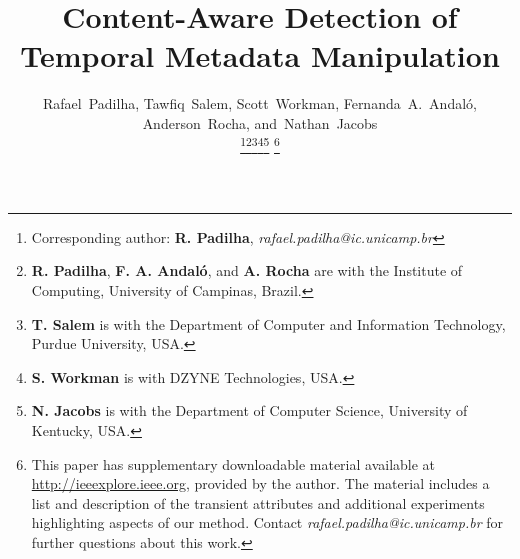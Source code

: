 \documentclass[journal]{IEEEtran}
\begin{document}
\title{Content-Aware Detection of\\ Temporal Metadata Manipulation}


\author{Rafael~Padilha, Tawfiq~Salem, Scott~Workman, Fernanda~A.~Andaló, Anderson~Rocha, and~Nathan~Jacobs

\thanks{Corresponding author: \textbf{R. Padilha}, \textit{rafael.padilha@ic.unicamp.br}}\thanks{\textbf{R. Padilha}, \textbf{F. A. Andaló}, and \textbf{A. Rocha} are with the Institute of Computing, 
University of Campinas, Brazil.}\thanks{\textbf{T. Salem} is with the Department of Computer and Information Technology, Purdue University, USA.}\thanks{\textbf{S. Workman} is with DZYNE Technologies, USA.}\thanks{\textbf{N. Jacobs} is with the Department of Computer Science, University of Kentucky, USA.}
\thanks{This paper has supplementary downloadable material available at \href{http://ieeexplore.ieee.org}{http://ieeexplore.ieee.org}, provided by the author. The material includes a list and description of the transient attributes and additional experiments highlighting aspects of our method. Contact \textit{rafael.padilha@ic.unicamp.br} for further questions about this work.}}


















\maketitle
\end{document}
